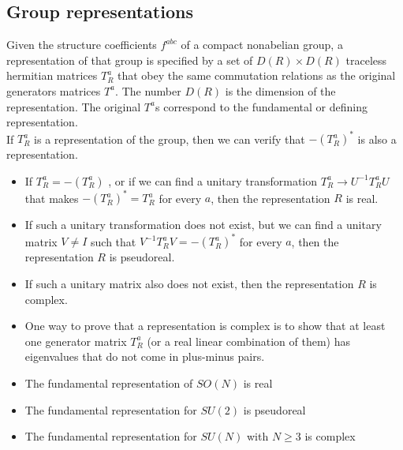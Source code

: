 \documentclass[cyan]{elegantnote}
\begin{document}
\subsection{Group representations}
Given the structure coefficients $f^{abc}$ of a compact nonabelian group, a representation of that group is specified by a set of $D(R)\times D(R)$ traceless hermitian matrices $T^a_R$ that obey the same commutation relations as the original generators matrices $T^a$.
The number $D(R)$ is the dimension of the representation. The original $T^a$s correspond to the fundamental or defining representation.
\\
If $T^a_R$ is a representation of the group, then we can verify that  $-(T^a_R)^*$ is also a representation. 
\begin{itemize}
\item If $T^a_R = -(T^a_R)$ , or if we can find a unitary transformation $T^a_R \to U^{-1}T^a_RU$ that makes $-(T^a_R)^* = T^a_R$ for every $a$, then the representation $R$ is real.
\item If such a unitary transformation does not exist, but we can find a unitary matrix $V \neq I$ such that $V^{-1}T^a_RV = -(T^a_R)^*$ for every $a$, then the representation $R$ is pseudoreal.
\item If such a unitary matrix also does not exist, then the representation $R$ is complex.
\item One way to prove that a representation is complex is to show that at least one generator matrix $T^a_R$ (or a real linear combination of them) has eigenvalues that do not come in plus-minus pairs.
\end{itemize}

\begin{example}
\begin{itemize}
\item The fundamental representation of $SO(N)$ is real
\item The fundamental representation for $SU(2)$ is pseudoreal
\item The fundamental representation for $SU(N)$ with $N \geq 3$ is complex
\end{itemize}
\end{example}
\end{document}
